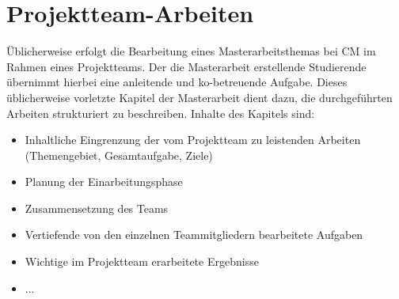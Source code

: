 \chapter{Projektteam-Arbeiten}
Üblicherweise erfolgt die Bearbeitung eines Masterarbeitsthemas bei \gls{CM} im Rahmen eines Projektteams. Der die Masterarbeit erstellende Studierende übernimmt hierbei eine anleitende und ko-betreuende Aufgabe. Dieses üblicherweise vorletzte Kapitel der Masterarbeit dient dazu, die durchgeführten Arbeiten strukturiert zu beschreiben. Inhalte des Kapitels sind:

\begin{itemize}
	\item Inhaltliche Eingrenzung der vom Projektteam zu leistenden Arbeiten (Themengebiet, Gesamtaufgabe, Ziele)
	\item Planung der Einarbeitungsphase
	\item Zusammensetzung des Teams
	\item Vertiefende von den einzelnen Teammitgliedern bearbeitete Aufgaben
	\item Wichtige im Projektteam erarbeitete Ergebnisse
	\item ...
\end{itemize}